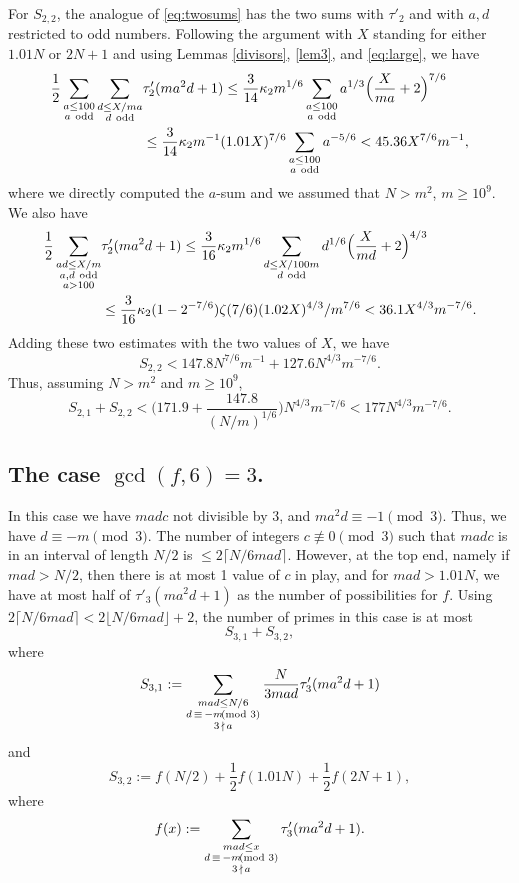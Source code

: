 \documentclass[12pt]{amsart}
\theoremstyle{definition}
\theoremstyle{remark}
\numberwithin{equation}{section}
\begin{document}
For $S_{2,2}$, the analogue of \eqref{eq:twosums} has the two sums with $\tau'_2$ and
with $a,d$ restricted to odd numbers.  Following the
argument with $X$ standing for either $1.01N$ or $2N+1$ and using Lemmas \ref{divisors},
\ref{lem3}, and \eqref{eq:large}, we have
\begin{align*}
\frac12\sum_{\substack{a\le100\\a~{\rm odd}}}\sum_{\substack{d\le X/ma\\d~{\rm odd}}}
&\tau'_{2}(ma^2d+1)\le\frac3{14}\kappa_2m^{1/6}\sum_{\substack{a\le100\\a~{\rm odd}}}
a^{1/3}\Big(\frac{X}{ma}+2\Big)^{7/6}\\
&\le \frac3{14}\kappa_2m^{-1}(1.01X)^{7/6}\sum_{\substack{a\le100\\a~{\rm odd}}}a^{-5/6}
<45.36X^{7/6}m^{-1},
\end{align*}
where we directly computed the $a$-sum and we assumed that $N>m^2$, $m\ge10^9$.
We also have
\begin{align*}
\frac12\sum_{\substack{ad\le X/m\\a,d~{\rm odd}\\a>100}}&\tau'_{2}(ma^2d+1)
\le\frac3{16}\kappa_2m^{1/6}\sum_{\substack{d\le X/100m\\d~{\rm odd}}}d^{1/6}\Big(\frac X{md}+2\Big)^{4/3}\\
&\le\frac3{16}\kappa_2(1-2^{-7/6})\zeta(7/6)(1.02X)^{4/3}/m^{7/6}<36.1X^{4/3}m^{-7/6}.
\end{align*}
Adding these two estimates with the two values of $X$, we have
\[
S_{2,2}<147.8N^{7/6}m^{-1}+127.6N^{4/3}m^{-7/6}.
\]
Thus, assuming $N>m^2$ and $m\ge10^9$,
\[
S_{2,1}+S_{2,2}<\Big(171.9+\frac{147.8}{(N/m)^{1/6}}\Big)N^{4/3}m^{-7/6}<177N^{4/3}m^{-7/6}.
\]

\subsection{The case $\gcd(f,6)=3$.}
In this case we have $madc$ not divisible by 3, and $ma^2d\equiv-1\pmod 3$.  Thus,
we have $d\equiv-m\pmod3$.  The number of integers $c\not\equiv0\pmod 3$ such
that $madc$ is in an interval of length $N/2$ is $\le2\lceil N/6mad\rceil$.  However,
at the top end, namely if $mad>N/2$, then there is at most 1 value of $c$ in play,
and for $mad>1.01N$, we have at most half of $\tau'_3(ma^2d+1)$ as the number of possibilities
for $f$.   Using $2\lceil N/6mad\rceil <2\lfloor N/6mad\rfloor+2$, the number of primes in this case is
at most
\[
S_{3,1}+S_{3,2},
\]
where
\[
S_{3,1}:=\sum_{\substack{mad\le N/6\\d\,\equiv\,-m\kern-5pt\pmod3\\3\,\nmid\, a}}\frac{N}{3mad}\tau'_3(ma^2d+1)
\]
and
 \begin{equation}
 \label{eq:fsum}
S_{3,2}:=f(N/2)+\frac12f(1.01N)+\frac12f(2N+1),
\end{equation}
where 
\begin{equation}
\label{eq:f(x)}
f(x):=\sum_{\substack{mad\le x\\d\,\equiv\,-m\kern-5pt\pmod3\\3\,\nmid\, a}}\tau'_3(ma^2d+1).
\end{equation}
\end{document}
